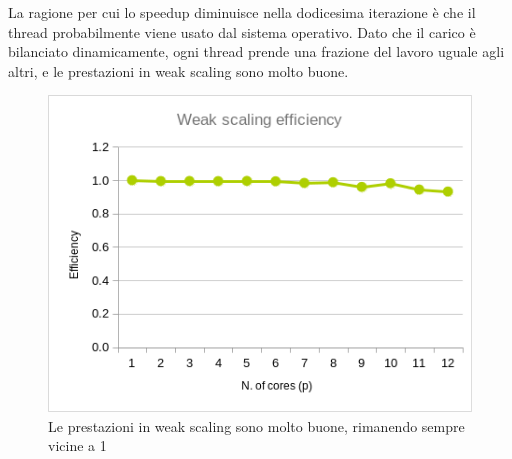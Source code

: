 \documentclass[a4paper,11pt, twoside]{report}
\begin{document}
La ragione per cui lo speedup diminuisce nella dodicesima iterazione è che il thread probabilmente viene usato dal sistema operativo.
Dato che il carico è bilanciato dinamicamente, ogni thread prende una frazione del lavoro uguale agli altri,
e le prestazioni in weak scaling sono molto buone.
\begin{figure}[H]
    \includegraphics[scale=0.5]{images/omp_weak.png}
    \caption[]{Le prestazioni in weak scaling sono molto buone, rimanendo sempre vicine a 1}
\end{figure}
\end{document}
